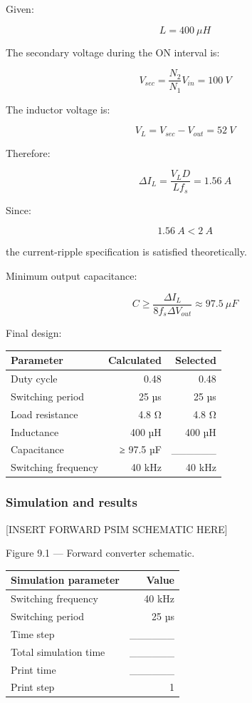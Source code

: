 \documentclass[
  paper=a4,
  oneside  ,captions=tableheading
]{scrartcl}
\newcounter{none}
\begin{document}
Given:

\[
L=400\ \mu H
\]

The secondary voltage during the ON interval is:

\[
V_{sec}
=
\frac{N_2}{N_1}V_{in}
=
100\ V
\]

The inductor voltage is:

\[
V_L=V_{sec}-V_{out}=52\ V
\]

Therefore:

\[
\Delta I_L=
\frac{V_LD}{Lf_s}
=
1.56\ A
\]

Since:

\[
1.56\ A < 2\ A
\]

the current-ripple specification is satisfied theoretically.

Minimum output capacitance:

\[
C\geq
\frac{\Delta I_L}
{8f_s\Delta V_{out}}
\approx97.5\ \mu F
\]

Final design:

{\def\LTcaptype{none} %
\begin{longtable}[]{@{}lrr@{}}
\toprule\noalign{}
Parameter & Calculated & Selected \\
\midrule\noalign{}
\endhead
\bottomrule\noalign{}
\endlastfoot
Duty cycle & 0.48 & 0.48 \\
Switching period & 25 µs & 25 µs \\
Load resistance & 4.8 Ω & 4.8 Ω \\
Inductance & 400 µH & 400 µH \\
Capacitance & ≥ 97.5 µF & \_\_\_\_\_\_ \\
Switching frequency & 40 kHz & 40 kHz \\
\end{longtable}
}

\subsubsection{Simulation and results}\label{simulation-and-results-3}

{[}INSERT FORWARD PSIM SCHEMATIC HERE{]}

Figure 9.1 --- Forward converter schematic.

{\def\LTcaptype{none} %
\begin{longtable}[]{@{}lr@{}}
\toprule\noalign{}
Simulation parameter & Value \\
\midrule\noalign{}
\endhead
\bottomrule\noalign{}
\endlastfoot
Switching frequency & 40 kHz \\
Switching period & 25 µs \\
Time step & \_\_\_\_\_\_ \\
Total simulation time & \_\_\_\_\_\_ \\
Print time & \_\_\_\_\_\_ \\
Print step & 1 \\
\end{longtable}
}
\end{document}
